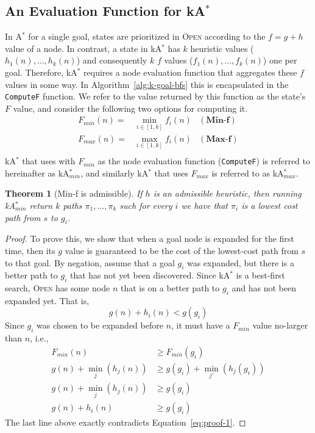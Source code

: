 \documentclass{aicom2e}
\newtheorem{theorem}{Theorem}
\newcommand{\astar}{A$^*$}
\newcommand{\kastar}{kA$^*$}
\newcommand{\kastarmin}{kA$^*_{min}$}
\newcommand{\kastarmax}{kA$^*_{max}$}
\newcommand{\minf}{Min-f}
\newcommand{\maxf}{Max-f}
\newcommand{\open}{\textsc{Open}}
\begin{document}
\subsection{An Evaluation Function for \kastar{}}
In \astar{} for a single goal, states are prioritized in \open{} according to the $f=g+h$ value of a node. 
In contrast, a state in \kastar{} has $k$ heuristic values ($h_1(n),\ldots,h_k(n)$) and 
consequently $k$ $f$ values ($f_1(n),\ldots,f_k(n)$) one per goal. Therefore, \kastar{} requires a node evaluation function that aggregates these $f$ values in some way. In Algorithm~\ref{alg:k-goal-bfs} this is encapsulated in the {\tt ComputeF} function. We refer to the value returned by this function as the state's $F$ value, and consider the following two options for computing it. 
\begin{align}
F_{min}(n)=&\min_{i\in [1,k]}f_i(n) & (\textbf{\minf})\\ 
F_{max}(n)=&\max_{i\in [1,k]}f_i(n) & (\textbf{\maxf})\\ 
\end{align}
\kastar{} that uses with $F_{min}$ as the node evaluation function ({\tt ComputeF}) 
is referred to hereinafter as \kastarmin{}, and similarly \kastar{} that uses $F_{max}$ is referred to 
as \kastarmax{}.
 


\begin{theorem}[\minf{} is admissible]
If $h$ is an admissible heuristic, then running \kastarmin{} return $k$ paths $\pi_1,\ldots, \pi_k$ such for every $i$ we have that $\pi_i$ is a lowest cost path from $s$ to $g_i$. 
\label{the:min-f}
\end{theorem}
 \begin{proof}
To prove this, we show that when a goal node is expanded for the first time, then its $g$ value is guaranteed to 
be the cost of the lowest-cost path from $s$ to that goal. 
By negation, assume that a goal $g_i$ was expanded, but there is a better path to $g_i$
that has not yet been discovered. Since \kastar{} is a best-first search, \open{} has some node $n$ that is on a better path to $g_i$ and has not been expanded yet. 
That is, 
\begin{equation}
g(n)+h_i(n)<g(g_i)
\label{eq:proof-1}
\end{equation}
Since $g_i$ was chosen to be expanded before $n$, it must have a $F_{min}$ value no-larger than $n$, i.e.,
\begin{align}
F_{min}(n) &\geq  F_{min}(g_i)\\
g(n)+\min_j(h_j(n))& \geq  g(g_i)+\min_{j'}(h_j(g_i))\\
g(n)+\min_j(h_j(n))& \geq  g(g_i)\\
g(n)+h_i(n) &\geq  g(g_i) 
\end{align}
The last line above exactly contradicts Equation~\ref{eq:proof-1}. 
\end{proof}
\end{document}

